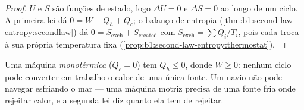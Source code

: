 \begin{proof}
$U$ e $S$ são funções de estado, logo $\Delta U = 0$ e $\Delta S = 0$ ao longo
de um ciclo. A primeira lei dá $0 = W + Q_h + Q_c$; o balanço de entropia
(\cref{thm:b1:second-law-entropy:secondlaw}) dá $0 = S_{\mathrm{exch}} +
S_{\mathrm{created}}$ com $S_{\mathrm{exch}} = \sum Q_i/T_i$, pois cada
 troca à sua própria temperatura fixa
(\cref{prop:b1:second-law-entropy:thermostat}).
\end{proof}

\begin{corollary}\label{cor:b1:heat-engines:kelvin}
Uma máquina \emph{monotérmica} ($Q_c = 0$) tem $Q_h \leq 0$, donde $W \geq 0$:
nenhum ciclo pode converter em trabalho o calor de uma única fonte. Um
navio não pode navegar esfriando o mar --- uma máquina motriz precisa de uma
fonte fria onde rejeitar calor, e a segunda lei diz quanto ela tem de rejeitar.
\end{corollary}

